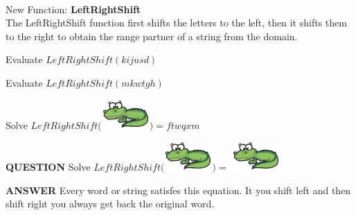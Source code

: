 \documentclass{ximera}
\begin{document}
\begin{exploration}
\quad \\
New Function: \textbf{LeftRightShift}\\
The LeftRightShift function first shifts the letters to the left, then it shifts them to the right to obtain the range partner of a string from the domain.
\quad \\


\begin{question}
Evaluate $LeftRightShift(kijusd)$
\begin{multipleChoice}
\end{multipleChoice}
\end{question}





\begin{question}
Evaluate $LeftRightShift(mkwtgh)$
\begin{multipleChoice}
\end{multipleChoice}
\end{question}




\begin{question}
Solve $LeftRightShift($\includegraphics{pics/alligator.png}$) = ftwqxm$
\begin{multipleChoice}
\end{multipleChoice}
\end{question}





\begin{dialogue}
\item[\textbf{QUESTION}] Solve $LeftRightShift($\includegraphics{pics/alligator.png}$ ) = $ \includegraphics{pics/alligator.png}
\item[\textbf{ANSWER}] Every word or string satisfes this equation.  It you shift left and then shift right you always get back the original word.
\end{dialogue}

\end{exploration}
\end{document}
